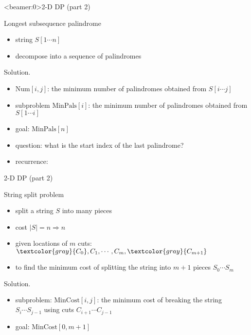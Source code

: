 \begin{frame}<beamer:0>{2-D DP (part 2)}
  \begin{exampleblock}{Longest subsequence palindrome }
    \begin{itemize}
      \item string $S[1 \cdots n]$
      \item decompose into a sequence of palindromes
    \end{itemize}
  \end{exampleblock}

  \begin{block}{Solution.}
    \begin{itemize}
      \item $\text{Num}[i,j]$: the minimum number of palindromes obtained from $S[i \cdots j]$
      \item subproblem $\text{MinPals}[i]$: the minimum number of palindromes obtained from $S[1 \cdots i]$
      \item goal: $\text{MinPals}[n]$
      \item question: what is the start index of the last palindrome?
      \item recurrence:
    \end{itemize}
  \end{block}
\end{frame}
\begin{frame}{2-D DP (part 2)}
  \begin{exampleblock}{String split problem }
    \begin{itemize}
      \item split a string $S$ into many pieces
      \item cost $|S| = n \Rightarrow n$
      \item given locations of $m$ cuts: $\textcolor{gray}{C_{0}}, C_{1}, \cdots, C_{m}, \textcolor{gray}{C_{m+1}}$
      \item to find the minimum cost of splitting the string into $m+1$ pieces
	$S_{0} \cdots S_{m}$
    \end{itemize}
  \end{exampleblock}

  \begin{block}{Solution.}
    \begin{itemize}
      \item subproblem: $\text{MinCost}[i,j]$: the minimum cost of breaking the string $S_{i} \cdots S_{j-1}$ using cuts $C_{i+1} \cdots C_{j-1}$
      \item goal: $\text{MinCost}[0,m+1]$
    \end{itemize}
  \end{block}
\end{frame}
